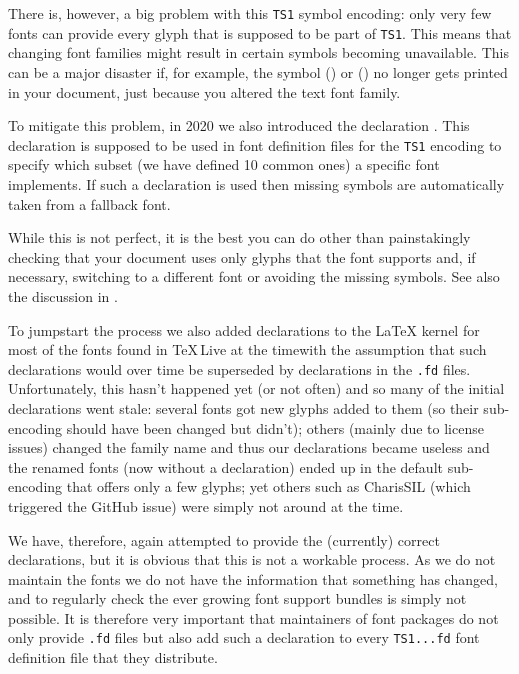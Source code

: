 \documentclass{ltnews}
\providecommand\Dash {\unskip \textemdash}
\providecommand\TL{\TeX\,Live}
\begin{document}
There is, however, a big problem with this \texttt{TS1} symbol
encoding: only very few fonts can provide every glyph that is supposed
to be part of \texttt{TS1}. This means that changing font families
might result in certain symbols becoming unavailable. This can be a
major disaster if, for example,
the symbol  (\texteuro) or  (\textohm)
no longer gets printed in your document, just because you altered the
text font family.

To mitigate this problem, in 2020 we also introduced the declaration
. This declaration is supposed to be used in
font definition files for the \texttt{TS1} encoding to specify which
subset (we have defined 10 common ones) a specific font implements. If
such a declaration is used then missing symbols are automatically
taken from a fallback font.

While this is not perfect, it is the best
you can do other than painstakingly checking that your document
uses only glyphs that the font supports
and, if necessary, switching to a different font or avoiding the
missing symbols. See also the discussion in \cite{39:ltnews33}.

To jumpstart the process we also added declarations to the \LaTeX{}
kernel for most of the fonts found in \TL{} at the time\Dash with
the assumption that such declarations would over time be superseded by
declarations in the \texttt{.fd} files. Unfortunately, this hasn't
happened yet (or not often) and so many of the initial declarations
went stale: several fonts got new glyphs added to them (so their
sub-encoding should have been changed but didn't); others (mainly due
to license issues) changed the family name and thus our declarations
became useless and the renamed fonts (now without a declaration) ended
up in the default sub-encoding that offers only a few glyphs;
yet others such as CharisSIL (which triggered the GitHub issue) were
simply not around at the time.

We have, therefore, again attempted to provide the (currently) correct
declarations, but it is obvious that this is not a workable
process. As we do not maintain the fonts we do not have the
information that something has changed, and to regularly check the
ever growing font support bundles is simply not possible. It is
therefore very important that maintainers of font packages do not only
provide \texttt{.fd} files but also add such a declaration to every
\texttt{TS1...fd} font definition file that they distribute.
\end{document}

